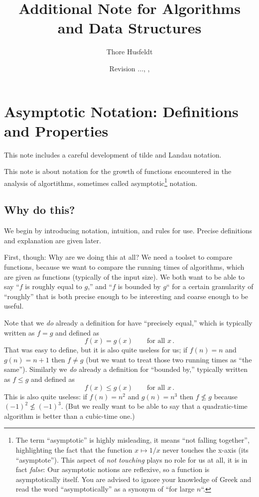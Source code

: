 \documentclass{tstextbook}
\title{Additional Note for Algorithms and Data Structures}
\author{Thore Husfeldt}
\date{\small Revision {\tt \GITAbrHash}$\ldots$, \GITAuthorDate, \GITAuthorName}
\begin{document}
\maketitle

\chapter{Asymptotic Notation: Definitions and Properties}

\begin{summary}
  This note includes a careful development of tilde and Landau notation.
  	

This note is about notation for the growth of functions encountered in the analysis of algortithms, sometimes called asymptotic\footnote{%
  The term “asymptotic” is highly misleading, it means “not falling together”, highlighting the fact that the function \(x\mapsto 1/x\) never touches the x-axis (its “asymptote”).
  This aspect of \emph{not touching} plays no role for us at all, it is in fact \emph{false}: 
  Our asymptotic notions are reflexive, so a function is asymptotically itself.
  You are advised to ignore your knowledge of Greek and read the word “asymptotically” as a synonym of “for large \(n\)“.}
notation.
\end{summary}

\section{Why do this?}

We begin by introducing notation, intuition, and rules for use.
Precise definitions and explanation are given later.

First, though: Why are we doing this at all?
We need a toolset to compare functions, because we want to compare the running times of algorithms, which are given as functions (typically of the input size). 
We both want to be able to say ``$f$ is roughly equal to $g$,''  and ``$f$ is bounded by $g$`` for a certain granularity of ``roughly'' that is both precise enough to be interesting and coarse enough to be useful.

Note that we \emph{do} already a definition for have ``precisely equal,'' which is typically written as $f=g$ and defined as
\[ f(x) = g(x)\qquad\text{for all $x$}\,.\]
That was easy to define, but it is also quite useless for us; if $f(n) = n$ and $g(n)= n + 1$ then $f\neq g$ (but we want to treat those two running times as ``the same'').
Similarly we \emph{do} already a definition for ``bounded by,'' typically written as $f\leq g$ and defined as
\[ f(x) \leq g(x)\qquad\text{for all $x$}\,.\]
This is also quite useless: if $f(n) = n^2$ and $g(n)= n^3$ then $f\not\leq g$ because $(-1)^2 \not\leq (-1)^3$.
(But we really want to be able to say that a quadratic-time algorithm is better than a cubic-time one.)
\end{document}
